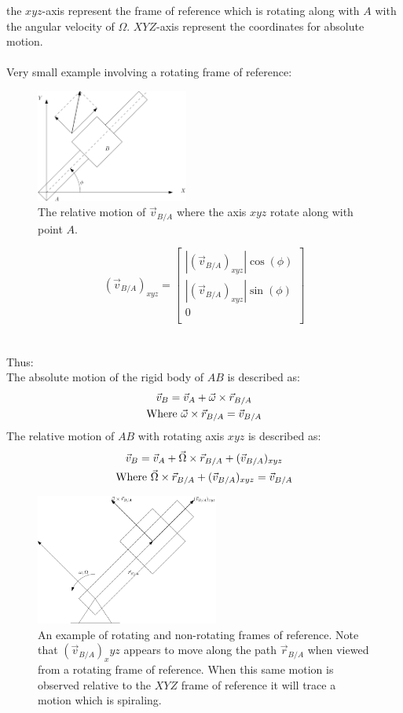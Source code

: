 \documentclass[11pt, a4paper]{article}
\begin{document}
the $xyz$-axis represent the frame of reference which is rotating along with $A$ with the angular velocity of $\Omega$. $XYZ$-axis represent the coordinates for absolute motion.\\
\\
Very small example involving a rotating frame of reference:
\begin{figure}[h]
  \centerline{\includegraphics[width=50mm]{images/Rotating_A.png}}
  \caption{The relative motion of $\vec{v}_{B/A}$ where the axis $xyz$ rotate along with point $A$.}
\end{figure}
\begin{equation}
  (\vec{v}_{B/A})_{xyz} = 
  \begin{bmatrix}
    |(\vec{v}_{B/A})_{xyz}|\cos(\phi)\\
    |(\vec{v}_{B/A})_{xyz}|\sin(\phi)\\
    0\\
  \end{bmatrix}
\end{equation}\\
\\
Thus:\\
The absolute motion of the rigid body of $AB$ is described as:
\begin{gather}
  \vec{v}_B = \vec{v}_A + \vec{\omega} \times \vec{r}_{B/A}\\
  \text{Where } \vec{\omega} \times \vec{r}_{B/A} = \vec{v}_{B/A} \notag
\end{gather}
The relative motion of $AB$ with rotating axis $xyz$ is described as:
\begin{gather}
  \vec{v}_B = \vec{v}_A + \vec{\Omega} \times \vec{r}_{B/A} + (\vec{v}_{B/A})_{xyz}\\
  \text{Where } \vec{\Omega} \times \vec{r}_{B/A} + (\vec{v}_{B/A})_{xyz} = \vec{v}_{B/A} \notag
\end{gather}
\begin{figure}[h]
  \centerline{\includegraphics[width=60mm]{images/Relative_velocities.png}}
  \caption{An example of rotating and non-rotating frames of reference. Note that $(\vec{v}_{B/A})_xyz$ appears to move along the path $\vec{r}_{B/A}$ when viewed from a rotating frame of reference. When this same motion is observed relative to the $XYZ$ frame of reference it will trace a motion which is spiraling.}
\end{figure}
\end{document}
